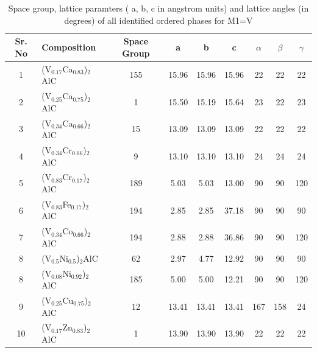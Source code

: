 \documentclass[preprint,amsmath,amssymb,aps, prb,showkeys]{revtex4-1}
\begin{document}
\begin{table}[htp!]
\centering
\setlength{\tabcolsep}{0.2cm}
\setlength\extrarowheight{6pt}
\begin{tabular}{clccccccc}
\hline
Sr. No & Composition                      & Space Group & a     & b     & c     & $\alpha$ & $\beta$ & $\gamma$ \\
\hline \hline
1     & (V$_{0.17}$Ca$_{0.83}$)$_2$AlC    & 155         & 15.96 & 15.96 & 15.96 & 22       & 22      & 22       \\
2     & (V$_{0.25}$Ca$_{0.75}$)$_2$AlC    & 1           & 15.50 & 15.19 & 15.64 & 23       & 22      & 23       \\
3     & (V$_{0.34}$Ca$_{0.66}$)$_2$AlC    & 15          & 13.09 & 13.09 & 13.09 & 22       & 22      & 22       \\
4     & (V$_{0.34}$Cr$_{0.66}$)$_2$AlC    & 9           & 13.10 & 13.10 & 13.10 & 24       & 24      & 24       \\
5     & (V$_{0.83}$Cr$_{0.17}$)$_2$AlC    & 189         & 5.03  & 5.03  & 13.00 & 90       & 90      & 120      \\
6     & (V$_{0.83}$Fe$_{0.17}$)$_2$AlC    & 194         & 2.85  & 2.85  & 37.18 & 90       & 90      & 90       \\
7     & (V$_{0.34}$Co$_{0.66}$)$_2$AlC    & 194         & 2.88  & 2.88  & 36.86 & 90       & 90      & 120      \\
8     & (V$_{0.5}$Ni$_{0.5}$)$_2$AlC      & 62          & 2.97  & 4.77  & 12.92 & 90       & 90      & 90       \\
8     & (V$_{0.08}$Ni$_{0.92}$)$_2$AlC    & 185         & 5.00  & 5.00  & 12.21 & 90       & 90      & 120      \\
9     & (V$_{0.25}$Cu$_{0.75}$)$_2$AlC    & 12          & 13.41 & 13.41 & 13.41 & 167      & 158     & 24      \\
10    & (V$_{0.17}$Zn$_{0.83}$)$_2$AlC    & 1           & 13.90 & 13.90 & 13.90 & 22       & 22      & 22       \\


\hline \hline
\end{tabular}
\caption{Space group, lattice paramters ( a, b, c in angstrom units) and lattice angles (in degrees)  of all identified ordered phases for M1=V}
\end{table}
\end{document}
